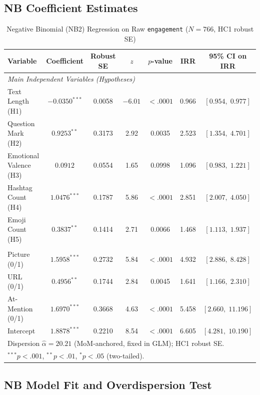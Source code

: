 \documentclass[12pt,a4paper]{article}
\begin{document}
\subsection{NB Coefficient Estimates}

\begin{table}[H]
\centering
\caption{Negative Binomial (NB2) Regression on Raw \texttt{engagement} ($N=766$, HC1 robust SE)}
\label{tab:nb_main}
\small
\begin{tabular}{lcccccc}
\toprule
Variable & Coefficient & Robust SE & $z$ & $p$-value & IRR & 95\% CI on IRR \\
\midrule
\multicolumn{7}{l}{\textit{Main Independent Variables (Hypotheses)}} \\
Text Length (H1) & $-0.0350^{***}$ & 0.0058 & $-6.01$ & $<.0001$ & 0.966 & $[0.954,\;0.977]$ \\
Question Mark (H2) & $0.9253^{**}$ & 0.3173 & 2.92 & 0.0035 & 2.523 & $[1.354,\;4.701]$ \\
Emotional Valence (H3) & $0.0912$ & 0.0554 & 1.65 & 0.0998 & 1.096 & $[0.983,\;1.221]$ \\
Hashtag Count (H4) & $1.0476^{***}$ & 0.1787 & 5.86 & $<.0001$ & 2.851 & $[2.007,\;4.050]$ \\
Emoji Count (H5) & $0.3837^{**}$ & 0.1414 & 2.71 & 0.0066 & 1.468 & $[1.113,\;1.937]$ \\
\addlinespace
\multicolumn{7}{l}{\textit{Control Variables (binary dummies)}} \\
Picture (0/1) & $1.5958^{***}$ & 0.2732 & 5.84 & $<.0001$ & 4.932 & $[2.886,\;8.428]$ \\
URL (0/1) & $0.4956^{**}$ & 0.1744 & 2.84 & 0.0045 & 1.641 & $[1.166,\;2.310]$ \\
At-Mention (0/1) & $1.6970^{***}$ & 0.3668 & 4.63 & $<.0001$ & 5.458 & $[2.660,\;11.196]$ \\
\addlinespace
Intercept & $1.8878^{***}$ & 0.2210 & 8.54 & $<.0001$ & 6.605 & $[4.281,\;10.190]$ \\
\bottomrule
\multicolumn{7}{l}{\small Dispersion $\hat\alpha = 20.21$ (MoM-anchored, fixed in GLM); HC1 robust SE.} \\
\multicolumn{7}{l}{\small $^{***}p<.001$, $^{**}p<.01$, $^{*}p<.05$ (two-tailed).} \\
\end{tabular}
\end{table}

\subsection{NB Model Fit and Overdispersion Test}
\end{document}
